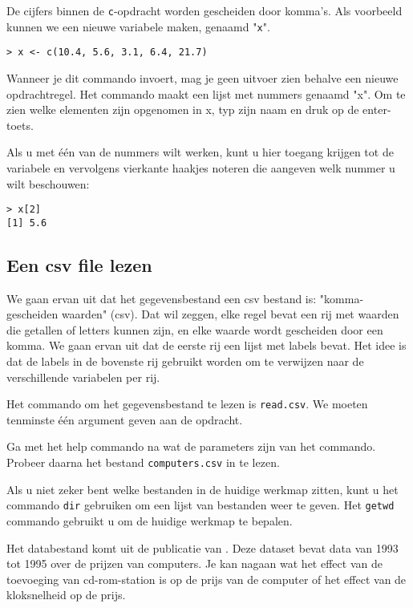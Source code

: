 De cijfers binnen de \texttt{c}-opdracht worden gescheiden door komma's. Als voorbeeld kunnen we een nieuwe variabele maken, genaamd "\texttt{x}".

\begin{lstlisting}
> x <- c(10.4, 5.6, 3.1, 6.4, 21.7)
\end{lstlisting}

Wanneer je dit commando invoert, mag je geen uitvoer zien behalve een nieuwe opdrachtregel. Het commando maakt een lijst met nummers genaamd "x". Om te zien welke elementen zijn opgenomen in x, typ zijn naam en druk op de enter-toets.

Als u met één van de nummers wilt werken, kunt u hier toegang krijgen tot de variabele en vervolgens vierkante haakjes noteren die aangeven welk nummer u wilt beschouwen:

\begin{lstlisting}
> x[2]
[1] 5.6
\end{lstlisting}

\subsection{Een csv file lezen}

We gaan ervan uit dat het gegevensbestand een csv bestand is: "komma-gescheiden waarden" (csv). Dat wil zeggen, elke regel bevat een rij met waarden die getallen of letters kunnen zijn, en elke waarde wordt gescheiden door een komma. We gaan ervan uit dat de eerste rij een lijst met labels bevat. Het idee is dat de labels in de bovenste rij gebruikt worden om te verwijzen naar de verschillende variabelen per rij.

Het commando om het gegevensbestand te lezen is \texttt{read.csv}. We moeten tenminste één argument geven aan de opdracht.

\begin{exercise}
  Ga met het help commando na wat de parameters zijn van het commando. Probeer daarna het bestand \texttt{computers.csv} in te lezen. 
\end{exercise}

Als u niet zeker bent welke bestanden in de huidige werkmap zitten, kunt u het commando \texttt{dir} gebruiken om een lijst van bestanden weer te geven. Het \texttt{getwd} commando gebruikt u om de huidige werkmap te bepalen.

Het databestand komt uit de publicatie van \autocite{Stengos2005}. Deze dataset bevat data van 1993 tot 1995 over de prijzen van computers. Je kan nagaan wat het effect van de toevoeging van cd-rom-station is op de prijs van de computer of  het effect van de kloksnelheid op de prijs. 

